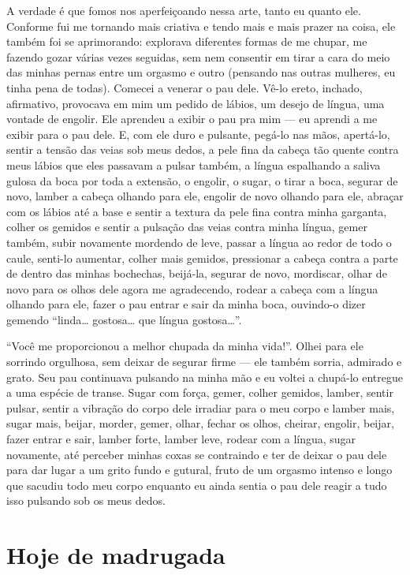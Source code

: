 A verdade é que fomos nos aperfeiçoando nessa arte, tanto eu quanto ele.
Conforme fui me tornando mais criativa e tendo mais e mais prazer na
coisa, ele também foi se aprimorando: explorava diferentes formas de me
chupar, me fazendo gozar várias vezes seguidas, sem nem consentir em
tirar a cara do meio das minhas pernas entre um orgasmo e outro
(pensando nas outras mulheres, eu tinha pena de todas). Comecei a
venerar o pau dele. Vê-lo ereto, inchado, afirmativo, provocava em mim
um pedido de lábios, um desejo de língua, uma vontade de engolir. Ele
aprendeu a exibir o pau pra mim --- eu aprendi a me exibir para o pau
dele. E, com ele duro e pulsante, pegá-lo nas mãos, apertá-lo, sentir a
tensão das veias sob meus dedos, a pele fina da cabeça tão quente contra
meus lábios que eles passavam a pulsar também, a língua espalhando a
saliva gulosa da boca por toda a extensão, o engolir, o sugar, o tirar a
boca, segurar de novo, lamber a cabeça olhando para ele, engolir de novo
olhando para ele, abraçar com os lábios até a base e sentir a textura da
pele fina contra minha garganta, colher os gemidos e sentir a pulsação
das veias contra minha língua, gemer também, subir novamente mordendo de
leve, passar a língua ao redor de todo o caule, senti-lo aumentar,
colher mais gemidos, pressionar a cabeça contra a parte de dentro das
minhas bochechas, beijá-la, segurar de novo, mordiscar, olhar de novo
para os olhos dele agora me agradecendo, rodear a cabeça com a língua
olhando para ele, fazer o pau entrar e sair da minha boca, ouvindo-o
dizer gemendo ``linda… gostosa… que língua
gostosa…''.

``Você me proporcionou a melhor chupada da minha vida!''. Olhei para ele
sorrindo orgulhosa, sem deixar de segurar firme --- ele também sorria,
admirado e grato. Seu pau continuava pulsando na minha mão e eu voltei a
chupá-lo entregue a uma espécie de transe. Sugar com força, gemer,
colher gemidos, lamber, sentir pulsar, sentir a vibração do corpo dele
irradiar para o meu corpo e lamber mais, sugar mais, beijar, morder,
gemer, olhar, fechar os olhos, cheirar, engolir, beijar, fazer entrar e
sair, lamber forte, lamber leve, rodear com a língua, sugar novamente,
até perceber minhas coxas se contraindo e ter de deixar o pau dele para
dar lugar a um grito fundo e gutural, fruto de um orgasmo intenso e
longo que sacudiu todo meu corpo enquanto eu ainda sentia o pau dele
reagir a tudo isso pulsando sob os meus dedos.

\chapter{Hoje de madrugada}


